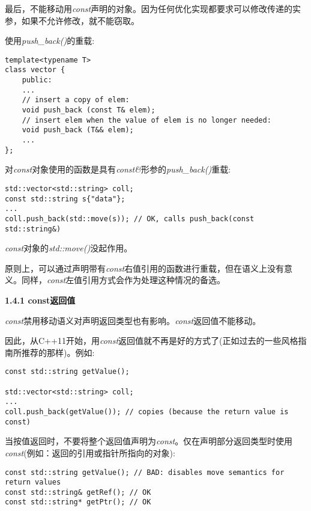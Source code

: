 最后，不能移动用\textit{const}声明的对象。因为任何优化实现都要求可以修改传递的实参，如果不允许修改，就不能窃取。\par

使用\textit{push\_back()}的重载:\par

\begin{lstlisting}[caption={}]
template<typename T>
class vector {
	public:
	...
	// insert a copy of elem:
	void push_back (const T& elem);
	// insert elem when the value of elem is no longer needed:
	void push_back (T&& elem);
	...
};
\end{lstlisting}

对\textit{const}对象使用的函数是具有\textit{const\&}形参的\textit{push\_back()}重载:\par

\begin{lstlisting}[caption={}]
std::vector<std::string> coll;
const std::string s{"data"};
...
coll.push_back(std::move(s)); // OK, calls push_back(const std::string&)
\end{lstlisting}

\textit{const}对象的\textit{std::move()}没起作用。\par

原则上，可以通过声明带有\textit{const}右值引用的函数进行重载，但在语义上没有意义。同样，\textit{const}左值引用方式会作为处理这种情况的备选。\par

\hspace*{\fill} \par %
\textbf{1.4.1 const返回值}

\textit{const}禁用移动语义对声明返回类型也有影响。\textit{const}返回值不能移动。\par

因此，从C++11开始，用\textit{const}返回值就不再是好的方式了(正如过去的一些风格指南所推荐的那样)。例如:\par

\begin{lstlisting}[caption={}]
const std::string getValue();

std::vector<std::string> coll;
...
coll.push_back(getValue()); // copies (because the return value is const)
\end{lstlisting}

当按值返回时，不要将整个返回值声明为\textit{const}。仅在声明部分返回类型时使用\textit{const}(例如：返回的引用或指针所指向的对象):\par

\begin{lstlisting}[caption={}]
const std::string getValue(); // BAD: disables move semantics for return values
const std::string& getRef(); // OK
const std::string* getPtr(); // OK
\end{lstlisting}





